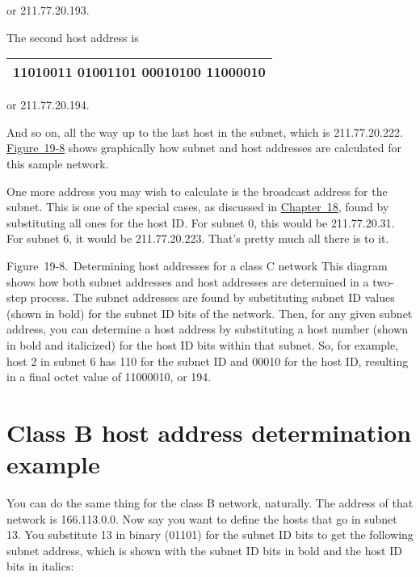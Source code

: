 or 211.77.20.193.

The second host address is

\begin{longtable}[]{@{}l@{}}
\toprule
\endhead
11010011 01001101 00010100 {\textbf{110}}{00010}\tabularnewline
\bottomrule
\end{longtable}

or 211.77.20.194.

And so on, all the way up to the last host in the subnet, which is
211.77.20.222.
\protect\hyperlink{ch19s05.htmlux5cux23determining_host_addresses_for_a_class_c}{Figure~19-8}
shows graphically how subnet and host addresses are calculated for this
sample network.

One more address you may wish to calculate is the broadcast address for
the subnet. This is one of the special cases, as discussed in
\protect\hyperlink{ch18.html}{Chapter~18}, found by substituting all
ones for the host ID. For subnet 0, this would be 211.77.20.31. For
subnet 6, it would be 211.77.20.223. That's pretty much all there is to
it.

\protect\hypertarget{ch19s05.htmlux5cux23determining_host_addresses_for_a_class_c}{}{}

\protect\hypertarget{ch19s05.htmlux5cux23I_mediaobject5_d1e21218}{}{}

Figure~19-8.~Determining host addresses for a class C network This
diagram shows how both subnet addresses and host addresses are
determined in a two-step process. The subnet addresses are found by
substituting subnet ID values (shown in bold) for the subnet ID bits of
the network. Then, for any given subnet address, you can determine a
host address by substituting a host number (shown in bold and
italicized) for the host ID bits within that subnet. So, for example,
host 2 in subnet 6 has 110 for the subnet ID and 00010 for the host ID,
resulting in a final octet value of 11000010, or 194.

\section{Class B host address determination example}

\protect\hypertarget{ch19s05.htmlux5cux23idx-CHP-19-0753}{}{}You can do
the same thing for the class B network, naturally. The address of that
network is 166.113.0.0. Now say you want to define the hosts that go in
subnet 13. You substitute 13 in binary (01101) for the subnet ID bits to
get the following subnet address, which is shown with the subnet ID bits
in bold and the host ID bits in italics:

